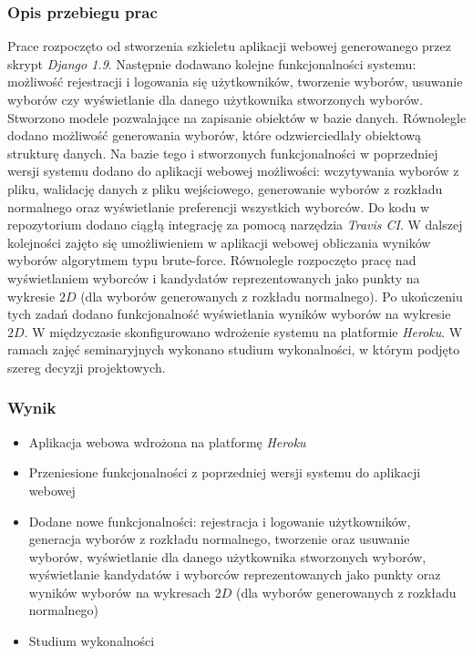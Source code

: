 \documentclass[pdflatex,11pt]{../aghdoc_version2}
\begin{document}
\subsubsection{Opis przebiegu prac}
Prace rozpoczęto od stworzenia szkieletu aplikacji webowej generowanego przez skrypt
\textit{Django 1.9}. Następnie dodawano kolejne funkcjonalności systemu: możliwość rejestracji i
logowania się użytkowników, tworzenie wyborów, usuwanie wyborów czy wyświetlanie dla
danego użytkownika stworzonych wyborów. Stworzono modele pozwalające na zapisanie
obiektów w bazie danych. Równolegle dodano możliwość generowania wyborów, które
odzwierciedlały obiektową strukturę danych. Na bazie tego i stworzonych funkcjonalności w
poprzedniej wersji systemu dodano do aplikacji webowej możliwości: wczytywania wyborów
z pliku, walidację danych z pliku wejściowego, generowanie wyborów z rozkładu normalnego
oraz wyświetlanie preferencji wszystkich wyborców. Do kodu w repozytorium dodano ciągłą
integrację za pomocą narzędzia \textit{Travis CI}. W dalszej kolejności zajęto się umożliwieniem w aplikacji webowej obliczania wyników wyborów algorytmem typu brute-force. Równolegle
rozpoczęto pracę nad wyświetlaniem wyborców i kandydatów reprezentowanych jako punkty
na wykresie $2D$ (dla wyborów generowanych z rozkładu normalnego). Po ukończeniu tych
zadań dodano funkcjonalność wyświetlania wyników wyborów na wykresie $2D$. W
międzyczasie skonfigurowano wdrożenie systemu na platformie \textit{Heroku}. W ramach zajęć
seminaryjnych wykonano studium wykonalności, w którym podjęto szereg decyzji
projektowych.
\subsubsection{Wynik}
\begin{itemize}
\item Aplikacja webowa wdrożona na platformę \textit{Heroku}
\item Przeniesione funkcjonalności z poprzedniej wersji systemu do aplikacji webowej
\item Dodane nowe funkcjonalności: rejestracja i logowanie użytkowników, generacja
wyborów z rozkładu normalnego, tworzenie oraz usuwanie wyborów, wyświetlanie
dla danego użytkownika stworzonych wyborów, wyświetlanie kandydatów i wyborców
reprezentowanych jako punkty oraz wyników wyborów na wykresach $2D$ (dla
wyborów generowanych z rozkładu normalnego)
\item Studium wykonalności
\end{itemize}
\end{document}
